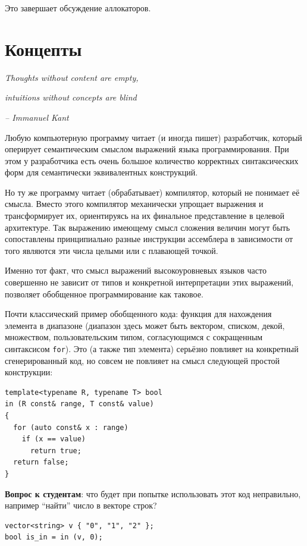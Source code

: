 \documentclass[a4paper,12pt,oneside]{book}
\begin{document}
Это завершает обсуждение аллокаторов.

\pagebreak
\section{Концепты}\label{Concepts}

\hfill\textit{Thoughts without content are empty,}

\hfill\textit{intuitions without concepts are blind}{\vspace{0.5em}}

\hfill\textit{-- Immanuel Kant}

Любую компьютерную программу читает (и иногда пишет) разработчик, который оперирует семантическим смыслом выражений языка программирования. При этом у разработчика есть очень большое количество корректных синтаксических форм для семантически эквивалентных конструкций.

Но ту же программу читает (обрабатывает) компилятор, который не понимает её смысла. Вместо этого компилятор механически упрощает выражения и трансформирует их, ориентируясь на их финальное представление в целевой архитектуре. Так выражению имеющему смысл сложения величин могут быть сопоставлены принципиально разные инструкции ассемблера в зависимости от того являются эти числа целыми или с плавающей точкой.

Именно тот факт, что смысл выражений высокоуровневых языков часто совершенно не зависит от типов и конкретной интерпретации этих выражений, позволяет обобщенное программирование как таковое.

Почти классический пример обобщенного кода: функция для нахождения элемента в диапазоне (диапазон здесь может быть вектором, списком, декой, множеством, пользовательским типом, согласующимся с сокращенным синтаксисом \lstinline!for!). Это (а также тип элемента) серьёзно повлияет на конкретный сгенерированный код, но совсем не повлияет на смысл следующей простой конструкции:

\begin{lstlisting}
template<typename R, typename T> bool 
in (R const& range, T const& value) 
{
  for (auto const& x : range)
    if (x == value)
      return true;
  return false;
}
\end{lstlisting}

\textbf{Вопрос к студентам}: что будет при попытке использовать этот код неправильно, например ``найти'' число в векторе строк?

\begin{lstlisting}
vector<string> v { "0", "1", "2" };
bool is_in = in (v, 0);
\end{lstlisting}
\end{document}
